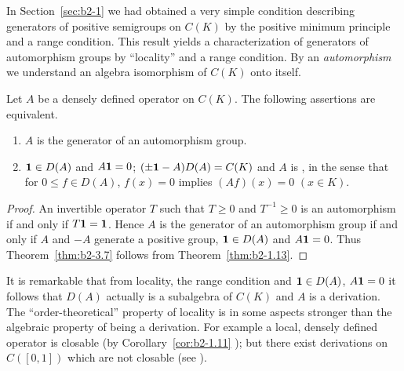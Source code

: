 In Section~\ref{sec:b2-1} we had obtained a very simple condition describing generators of positive semigroups on $C(K)$ by the positive minimum principle and a range condition.
This result yields a characterization of generators of automorphism groups by \enquote{locality} and a range condition.
By an \emph{automorphism} we understand an algebra isomorphism of\/ $C(K)$ onto itself.
\begin{theorem}\label{thm:b2-3.7}
Let $A$ be a densely defined operator on $C(K)$.
The following assertions are equivalent.
\begin{enumerate}[\upshape (a)]
\item \label{thm:b2-3.7-1}
$A$ is the generator of an automorphism group.
\item \label{thm:b2-3.7-2}
$\mathbf{1} \in D(A)$ and $A\mathbf{1} = 0$; $(\pm \mathbf{1} - A)D(A) = C(K)$ and $A$ is , in the sense that for $0 \leq f \in D(A)$, $f(x) = 0$ implies $(Af)(x) = 0$ $(x \in K)$.
\end{enumerate}
\end{theorem}
\begin{proof}
An invertible operator $T$ such that $T \geq 0$ and $T^{-1} \geq 0$ is an automorphism if and only if\/ $T\mathbf{1} = \mathbf{1}$.
Hence $A$ is the generator of an automorphism group if and only if\/ $A$ and $-A$ generate a positive group, $\mathbf{1} \in D(A)$ and $A\mathbf{1} = 0$.
Thus Theorem~\ref{thm:b2-3.7} follows from Theorem~\ref{thm:b2-1.13}.
\end{proof}
\begin{remark*}\label{rem:b2-3.7a}
It is remarkable that from locality, the range condition and $\mathbf{1} \in D(A)$, $A\mathbf{1} = 0$ it follows that $D(A)$ actually is a subalgebra of\/ $C(K)$ and $A$ is a derivation.
The \enquote{order-theoretical} property of locality is in some aspects stronger than the algebraic property of being a derivation.
For example a local, densely defined operator is closable (by Corollary~\ref{cor:b2-1.11} ); but there exist derivations on $C([0,1])$ which are not closable (see \textcite{brattelirobinson:1975}).
\end{remark*}
